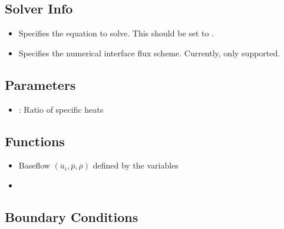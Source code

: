 \subsection{Solver Info}
\begin{itemize}
\item {} Specifies the equation to solve. This should be set to
.
\item {} Specifies the numerical interface flux scheme.
Currently, only  supported.
\end{itemize}

\subsection{Parameters}
\begin{itemize}
\item {}: Ratio of specific heats
\end{itemize}

\subsection{Functions}
\begin{itemize}
\item {} Baseflow $(\overline{u}_i, \overline{p}, \overline{\rho})$ defined by the variables 
\item {}
\end{itemize}


\subsection{Boundary Conditions}

